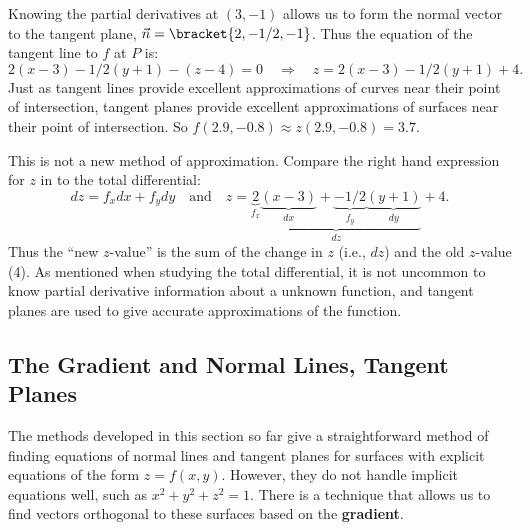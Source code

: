 {Knowing the partial derivatives at $(3,-1)$ allows us to form the normal vector to the tangent plane, $\vec n =\bracket{2,-1/2,-1}$. Thus the equation of the tangent line to $f$ at $P$ is:
\begin{equation}
2(x-3)-1/2(y+1) - (z-4) = 0
\quad \Rightarrow \quad
z = 2(x-3)-1/2(y+1)+4.\label{eq:tpl7}
\end{equation}
Just as tangent lines provide excellent approximations of curves near their point of intersection, tangent planes provide excellent approximations of surfaces near their point of intersection. So $f(2.9,-0.8) \approx z(2.9,-0.8) = 3.7.$

This is not a new method of approximation. Compare the right hand expression for $z$ in  to the total differential:
\[
dz = f_xdx + f_ydy \quad \text{and} \quad z =
\underbrace{\underbrace{2}_{f_x}\underbrace{(x-3)}_{dx}
+\underbrace{-1/2}_{f_y}\underbrace{(y+1)}_{dy}}_{dz}+4.
\]
Thus the ``new $z$-value'' is the sum of the change in $z$ (i.e., $dz$) and the old $z$-value (4). As mentioned when studying the total differential, it is not uncommon to know partial derivative information about a unknown function, and tangent planes are used to give accurate approximations of the function.}

\subsection{The Gradient and Normal Lines, Tangent Planes}

The methods developed in this section so far give a straightforward method of finding equations of normal lines and tangent planes for surfaces with explicit equations of the form $z=f(x,y)$. However, they do not handle implicit equations well, such as $x^2+y^2+z^2=1$. There is a technique that allows us to find vectors orthogonal to these surfaces based on the \textbf{gradient}.


